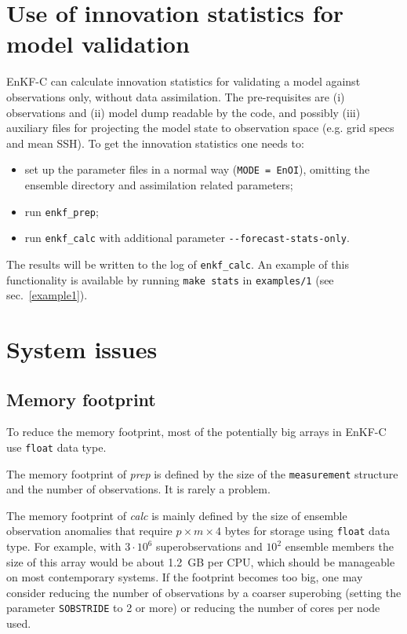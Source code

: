 \documentclass[11pt]{report}
\begin{document}
\section{Use of innovation statistics for model validation}

EnKF-C can calculate innovation statistics for validating a model against observations only, without data assimilation.
The pre-requisites are (i) observations and (ii) model dump readable by the code, and possibly (iii) auxiliary files for projecting the model state to observation space (e.g. grid specs and mean SSH).
To get the innovation statistics one needs to:
\begin{itemize}
\item set up the parameter files in a normal way (\verb|MODE = EnOI|), omitting the ensemble directory and assimilation related parameters;
\item run \verb|enkf_prep|;
\item run \verb|enkf_calc| with additional parameter \verb|--forecast-stats-only|.
\end{itemize}
The results will be written to the log of \verb|enkf_calc|. 
An example of this functionality is available by running \verb|make stats| in \verb|examples/1| (see sec.~\ref{example1}).

\section{System issues}

\subsection{Memory footprint}

To reduce the memory footprint, most of the potentially big arrays in EnKF-C use \verb|float| data type.

The memory footprint of \emph{prep} is defined by the size of the \verb|measurement| structure and the number of observations.
It is rarely a problem.

The memory footprint of \emph{calc} is mainly defined by the size of ensemble observation anomalies that require $p \times m \times 4$ bytes for storage using \verb|float| data type.
For example, with $3 \cdot 10^6$ superobservations and $10^2$ ensemble members the size of this array would be about 1.2\, GB per CPU, which should be manageable on most contemporary systems.
If the footprint becomes too big, one may consider reducing the number of observations by a coarser superobing (setting the parameter \verb|SOBSTRIDE| to 2 or more) or reducing the number of cores per node used.
\end{document}
